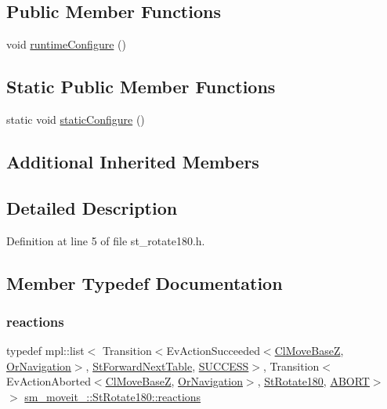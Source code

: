 \subsection*{Public Member Functions}
\begin{DoxyCompactItemize}
\item 
void \hyperlink{structsm__moveit__3_1_1StRotate180_a9669445b3273306a66e49d720336bfbf}{runtime\+Configure} ()
\end{DoxyCompactItemize}
\subsection*{Static Public Member Functions}
\begin{DoxyCompactItemize}
\item 
static void \hyperlink{structsm__moveit__3_1_1StRotate180_ac00fb957306237c98b1f6f1b5d43aa50}{static\+Configure} ()
\end{DoxyCompactItemize}
\subsection*{Additional Inherited Members}


\subsection{Detailed Description}


Definition at line 5 of file st\+\_\+rotate180.\+h.



\subsection{Member Typedef Documentation}
\mbox{\label{structsm__moveit__3_1_1StRotate180_ae04458fe6f264c42604facf6d3546be2}} 
\subsubsection{\texorpdfstring{reactions}{reactions}}
{\footnotesize\ttfamily typedef mpl\+::list$<$ Transition$<$Ev\+Action\+Succeeded$<$\hyperlink{classcl__move__base__z_1_1ClMoveBaseZ}{Cl\+Move\+BaseZ}, \hyperlink{classsm__moveit__3_1_1OrNavigation}{Or\+Navigation}$>$, \hyperlink{structsm__moveit__3_1_1StForwardNextTable}{St\+Forward\+Next\+Table}, \hyperlink{classSUCCESS}{S\+U\+C\+C\+E\+SS}$>$, Transition$<$Ev\+Action\+Aborted$<$\hyperlink{classcl__move__base__z_1_1ClMoveBaseZ}{Cl\+Move\+BaseZ}, \hyperlink{classsm__moveit__3_1_1OrNavigation}{Or\+Navigation}$>$, \hyperlink{structsm__moveit__3_1_1StRotate180}{St\+Rotate180}, \hyperlink{classABORT}{A\+B\+O\+RT}$>$ $>$ \hyperlink{structsm__moveit__3_1_1StRotate180_ae04458fe6f264c42604facf6d3546be2}{sm\+\_\+moveit\+\_\+::\+St\+Rotate180\+::reactions}}



